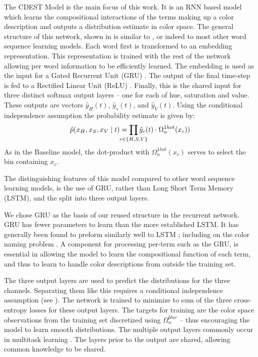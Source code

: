 \documentclass[11pt,a4paper]{article}
\newcommand{\parencite}{\citep}
\newcommand{\textcite}{\cite}
\begin{document}
The CDEST Model is the main focus of this work.
It is an RNN based model which learns the compositional interactions of the terms making up a color description and outputs a distribution estimate in color space.
The general structure of this network, shown in  is similar to \textcite{2016arXiv160603821M}, or indeed to most other word sequence learning models.
Each word first is transformed to an embedding representation.
This representation is trained with the rest of the network allowing per word information to be efficiently learned.
The embedding is used as the input for a Gated Recurrent Unit (GRU)  \parencite{cho2014properties}.
The output of the final time-step is fed to a Rectified Linear Unit (ReLU)  \parencite{dahl2013reludropout}.
Finally, this is the shared input for three distinct softmax output layers -- one for each of hue, saturation and value.
These outputs are vectors $\hat{y}_{H}(t)$, $\hat{y}_{s}(t)$, and $\hat{y}_{V}(t)$.
Using the conditional independence assumption the probability estimate is given by:
\[
	\hat{p}(x_H,x_S,x_V\mid t) = \displaystyle\prod_{
		\mathclap{c\in {\{H,S,V\}}}}
	 \hat{y}_{c}(t)\cdot \Omega_{n}^{1hot}(x_c))
\]
As in the Baseline model, the dot-product with $\Omega_{n}^{1hot}(x_c)$ serves to select the bin containing $x_c$.

The distinguishing features of this model compared to other word sequence learning models, is the use of GRU, rather than Long Short Term Memory (LSTM), and the split into three output layers.

We chose GRU as the basis of our reused structure in the recurrent network.
GRU has fewer parameters to learn than the more established LSTM.
It has generally been found to preform similarly well to LSTM \parencite{chung2014empirical};
including on the color naming problem \parencite{2016arXiv160603821M}.
A component for processing per-term such as the GRU, is essential in allowing the model to learn the compositional function of each term,  and thus to learn to handle color descriptions from outside the training set.

The three output layers are used to predict the distributions for the three channels.
Separating them like this requires a conditional independence assumption (see ).
The network is trained to minimize to sum of the three cross-entropy losses for these output layers.
The targets for training are the color space observations from the training set discretized using $\Omega_n^{blur}$ -- thus encouraging the model to learn smooth distributions.
The multiple output layers commonly occur in multitask learning \parencite{caruana1997multitask,collobert2008unified}.
The layers prior to the output are shared, allowing common knowledge to be shared.
\end{document}
